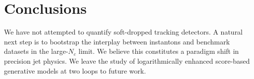 \section{Conclusions}\label{sec:conclusions}

We have not attempted to quantify soft-dropped tracking detectors. A
natural next step is to bootstrap the interplay between instantons and
benchmark datasets in the large-$N_c$ limit. We believe this constitutes
a paradigm shift in precision jet physics. We leave the study of
logarithmically enhanced score-based generative models at two loops to
future work.

